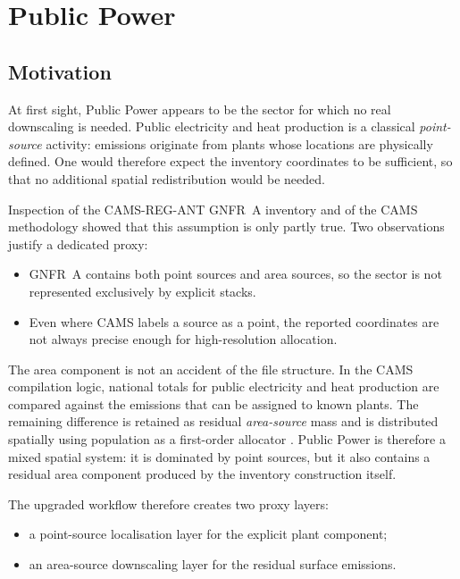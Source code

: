 \section{Public Power}
\label{sec:publicpower}

\subsection{Motivation}

At first sight, Public Power appears to be the sector for which no real
downscaling is needed. Public electricity and heat production is a classical
\emph{point-source} activity: emissions originate from plants whose locations
are physically defined. One would therefore expect the inventory coordinates to
be sufficient, so that no additional spatial redistribution would be needed.

Inspection of the CAMS-REG-ANT GNFR~A inventory and of the CAMS methodology
showed that this assumption is only partly true. Two observations justify a
dedicated proxy:
\begin{itemize}
  \item GNFR~A contains both point sources and area sources, so the sector is
        not represented exclusively by explicit stacks.
  \item Even where CAMS labels a source as a point, the reported coordinates
        are not always precise enough for high-resolution allocation.
\end{itemize}

The area component is not an accident of the file structure. In the CAMS
compilation logic, national totals for public electricity and heat production
are compared against the emissions that can be assigned to known plants. The
remaining difference is retained as residual \emph{area-source} mass and is
distributed spatially using population as a first-order allocator
\cite{CAMS_glob_ant_61}. Public Power is therefore a mixed spatial system: it
is dominated by point sources, but it also contains a residual area component
produced by the inventory construction itself.

The upgraded workflow therefore creates two proxy layers:
\begin{itemize}
  \item a point-source localisation layer for the explicit plant component;
  \item an area-source downscaling layer for the residual surface emissions.
\end{itemize}

